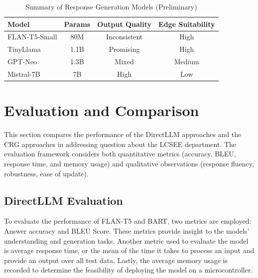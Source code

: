 \documentclass[conference]{IEEEtran}
\begin{document}
\begin{table}[h]
    \centering
    \caption{Summary of Response Generation Models (Preliminary)}
    \begin{tabular}{l|c|c|c}
    \hline
    \textbf{Model} & \textbf{Params} & \textbf{Output Quality} & \textbf{Edge Suitability} \\
    \hline
    FLAN-T5-Small & 80M & Inconsistent & High  \\
    TinyLlama & 1.1B & Promising & High  \\
    GPT-Neo & 1.3B & Mixed & Medium  \\
    Mistral-7B & 7B & High & Low  \\
    \hline
    \end{tabular}
    \label{tab:generation_models}
\end{table}

\section{Evaluation and Comparison} \label{sec:evaluation}
This section compares the performance of the DirectLLM approaches and the CRG approaches in addressing question about the LCSEE department.
The evaluation framework considers both quantitative metrics (accuracy, BLEU, response time, and memory usage) and qualitative observations (response fluency, robustness, ease of update).
\subsection{DirectLLM Evaluation}
To evaluate the performance of FLAN-T5 and BART, two metrics are employed: Answer accuracy and BLEU Score. 
These metrics provide insight to the models' understanding and generation tasks.
Another metric used to evaluate the model is average response time, or the mean of the time it takes to process an input and provide an output over all test data.
Lastly, the average memory usage is recorded to determine the feasibility of deploying the model on a microcontroller.

\noindent

\end{document}
